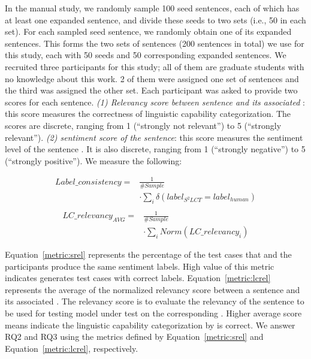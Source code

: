 In the manual study, we randomly sample 100 \tool seed sentences, each of which has at least one expanded sentence, and divide these seeds to two sets (i.e., 50 in each set). For each sampled seed sentence, we randomly obtain one of its expanded sentences.
This forms the two sets of sentences (200 sentences in total) we use for this study, each with 50 seeds and 50 corresponding expanded sentences.
We recruited three participants for this study; all of them are graduate students with no knowledge about this work. 
2 of them were assigned one set of sentences and the third was assigned the other set.
Each participant was asked to provide two scores for each sentence.
\emph{(1) Relevancy score between sentence and its associated \lc}:
this score measures the correctness of \tool linguistic capability categorization.  The scores are discrete,
ranging from 1 (``strongly not relevant'') to 5 (``strongly relevant''). \emph{(2) sentiment score of the sentence}: this score measures the sentiment level of the sentence . It
is also discrete, ranging from 1 (``strongly
negative'') to 5 (``strongly positive''). 
We measure the following:

\begin{equation}
\begin{aligned}
  Label\_consistency = &\frac{1}{\#Sample}\\
  &\cdot \sum_{i} \delta(label_{S^2LCT}=label_{human})\label{metric:srel}\\
\end{aligned}
\end{equation}
\begin{equation}
\begin{aligned}
  LC\_relevancy_{AVG} = &\frac{1}{\#Sample}\\
  &\cdot\sum_{i} Norm(LC\_relevancy_i) \label{metric:lcrel}
\end{aligned}
\end{equation}

Equation~\ref{metric:srel} represents the percentage of the test cases that \tool and the participants produce the same sentiment labels. High value of this metric indicates \tool generates test cases with correct labels. Equation~\ref{metric:lcrel} represents the average of the
normalized relevancy score between a sentence and its associated
\lc. The relevancy score is to evaluate the relevancy of the sentence to be used for testing model under test on the corresponding \lc. Higher average score means indicate the linguistic capability categorization by \tool is correct. We answer RQ2 and RQ3 using the metrics defined by
Equation~\ref{metric:srel} and Equation~\ref{metric:lcrel},
respectively.





